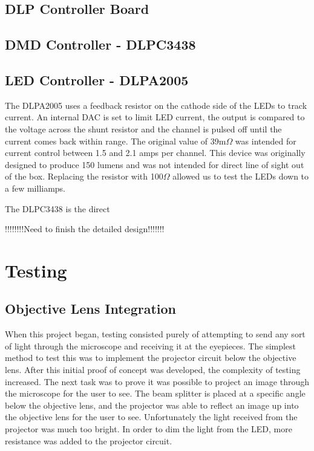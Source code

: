 \documentclass[12pt,a4paper]{article}
\begin{document}
\subsection{DLP Controller Board}

\subsection{DMD Controller - DLPC3438}


\subsection{LED Controller - DLPA2005}
The DLPA2005 uses a feedback resistor on the cathode side of the LEDs to track current. An internal DAC is set to limit LED current, the output is compared to the voltage across the shunt resistor and the channel is pulsed off until the current comes back within range. The original value of 39m$\Omega$ was intended for current control between 1.5 and 2.1 amps per channel. This device was originally designed to produce 150 lumens and was not intended for direct line of sight out of the box. Replacing the resistor with 100$\Omega$ allowed us to test the LEDs down to a few milliamps. 

The DLPC3438 is the direct 



!!!!!!!!Need to finish the detailed design!!!!!!!


\section{Testing}
\subsection{Objective Lens Integration}
When this project began, testing consisted purely of attempting to send any sort of light through the microscope and receiving it at the eyepieces. The simplest method to test this was to implement the projector circuit below the objective lens. After this initial proof of concept was developed, the complexity of testing increased. The next task was to prove it was possible to project an image through the microscope for the user to see. The beam splitter is placed at a specific angle below the objective lens, and the projector was able to reflect an image up into the objective lens for the user to see. Unfortunately the light received from the projector was much too bright. In order to dim the light from the LED, more resistance was added to the projector circuit.
\end{document}

